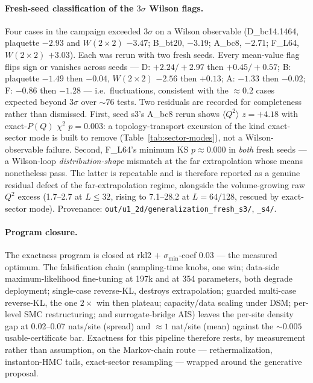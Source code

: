 \paragraph{Fresh-seed classification of the $3\sigma$ Wilson flags.} Four
cases in the campaign exceeded $3\sigma$ on a Wilson observable
(D\_bc14.1464, plaquette $-2.93$ and $W(2{\times}2)$ $-3.47$; B\_bt20,
$-3.19$; A\_bc8, $-2.71$; F\_L64, $W(2{\times}2)$ $+3.03$). Each was rerun
with two fresh seeds. Every mean-value flag flips sign or vanishes across
seeds --- D: $+2.24 / +2.97$ then $+0.45 / +0.57$; B: plaquette $-1.49$ then
$-0.04$, $W(2{\times}2)$ $-2.56$ then $+0.13$; A: $-1.33$ then $-0.02$;
F: $-0.86$ then $-1.28$ --- i.e.\ fluctuations, consistent with the ${\approx}0.2$
cases expected beyond $3\sigma$ over ${\sim}76$ tests. Two residuals are
recorded for completeness rather than dismissed. First, seed s3's A\_bc8
rerun shows $\langle Q^2\rangle$ $z = +4.18$ with exact-$P(Q)$ $\chi^2$
$p = 0.003$: a topology-transport excursion of the kind exact-sector mode is
built to remove (Table~\ref{tab:sector-modes}), not a Wilson-observable
failure. Second, F\_L64's minimum KS $p \approx 0.000$ in \emph{both} fresh
seeds --- a Wilson-loop \emph{distribution-shape} mismatch at the far
extrapolation whose means nonetheless pass. The latter is repeatable and is
therefore reported as a genuine residual defect of the far-extrapolation
regime, alongside the volume-growing raw $Q^2$ excess (1.7--2.7 at
$L \le 32$, rising to 7.1--28.2 at $L = 64$/128, rescued by exact-sector
mode). Provenance: \texttt{out/u1\_2d/generalization\_fresh\_s3/},
\texttt{\_s4/}.

\paragraph{Program closure.} The exactness program is closed at rkl2 $+$
$\sigma_{\min}$-coef 0.03 --- the measured optimum. The falsification chain
(sampling-time knobs, one win; data-side maximum-likelihood fine-tuning at
197k and at 354 parameters, both degrade deployment; single-case reverse-KL,
destroys extrapolation; guarded multi-case reverse-KL, the one $2\times$ win
then plateau; capacity/data scaling under DSM; per-level SMC restructuring;
and surrogate-bridge AIS) leaves the per-site density gap at 0.02--0.07
nats/site (spread) and ${\approx}1$ nat/site (mean) against the
${\sim}0.005$ usable-certificate bar. Exactness for this pipeline therefore
rests, by measurement rather than assumption, on the Markov-chain route ---
rethermalization, instanton-HMC tails, exact-sector resampling --- wrapped
around the generative proposal.

